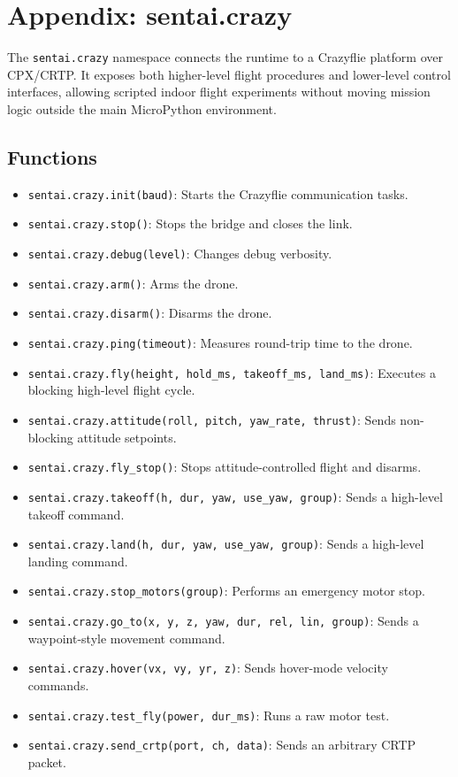 \section{Appendix: sentai.crazy}\label{appendix-sentai.crazy}

The \texttt{sentai.crazy} namespace connects the runtime to a Crazyflie
platform over CPX/CRTP. It exposes both higher-level flight procedures
and lower-level control interfaces, allowing scripted indoor flight
experiments without moving mission logic outside the main MicroPython
environment.

\subsection{Functions}\label{functions-13}

\begin{itemize}
\tightlist
\item
  \texttt{sentai.crazy.init(baud)}: Starts the Crazyflie communication
  tasks.
\item
  \texttt{sentai.crazy.stop()}: Stops the bridge and closes the link.
\item
  \texttt{sentai.crazy.debug(level)}: Changes debug verbosity.
\item
  \texttt{sentai.crazy.arm()}: Arms the drone.
\item
  \texttt{sentai.crazy.disarm()}: Disarms the drone.
\item
  \texttt{sentai.crazy.ping(timeout)}: Measures round-trip time to the
  drone.
\item
  \texttt{sentai.crazy.fly(height,\ hold\_ms,\ takeoff\_ms,\ land\_ms)}:
  Executes a blocking high-level flight cycle.
\item
  \texttt{sentai.crazy.attitude(roll,\ pitch,\ yaw\_rate,\ thrust)}:
  Sends non-blocking attitude setpoints.
\item
  \texttt{sentai.crazy.fly\_stop()}: Stops attitude-controlled flight
  and disarms.
\item
  \texttt{sentai.crazy.takeoff(h,\ dur,\ yaw,\ use\_yaw,\ group)}: Sends
  a high-level takeoff command.
\item
  \texttt{sentai.crazy.land(h,\ dur,\ yaw,\ use\_yaw,\ group)}: Sends a
  high-level landing command.
\item
  \texttt{sentai.crazy.stop\_motors(group)}: Performs an emergency motor
  stop.
\item
  \texttt{sentai.crazy.go\_to(x,\ y,\ z,\ yaw,\ dur,\ rel,\ lin,\ group)}:
  Sends a waypoint-style movement command.
\item
  \texttt{sentai.crazy.hover(vx,\ vy,\ yr,\ z)}: Sends hover-mode
  velocity commands.
\item
  \texttt{sentai.crazy.test\_fly(power,\ dur\_ms)}: Runs a raw motor
  test.
\item
  \texttt{sentai.crazy.send\_crtp(port,\ ch,\ data)}: Sends an arbitrary
  CRTP packet.
\end{itemize}

